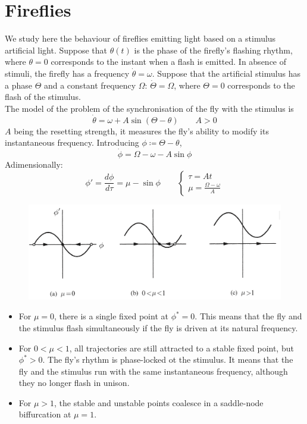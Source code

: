 \documentclass[12pt, openany]{report}
\theoremstyle{definition}
\begin{document}
\section{Fireflies}
We study here the behaviour of fireflies emitting light based on a stimulus artificial light. Suppose that $\theta(t)$ is the phase of the firefly's flashing rhythm, where $\theta = 0$ corresponds to the instant when a flash is emitted. In absence of stimuli, the firefly has a frequency $\dot \theta = \omega$. Suppose that the artificial stimulus has a phase $\Theta$ and a constant frequency $\Omega$: $\dot \Theta = \Omega$, where $\Theta=0$ corresponds to the flash of the stimulus. \\
The model of the problem of the synchronisation of the fly with the stimulus is 
\begin{equation}
    \dot \theta = \omega + A\sin (\Theta-\theta)\qquad A>0
\end{equation}
$A$ being the resetting strength, it measures the fly's ability to modify its instantaneous frequency. Introducing $\phi \coloneqq \Theta-\theta$, 
\begin{equation}
    \dot \phi = \Omega-\omega -A\sin \phi
\end{equation}
Adimensionally: 
\begin{equation}
    \phi'=\frac{d\phi}{d\tau}=\mu-\sin \phi \qquad \begin{cases}
        \tau = At\\
        \mu = \frac{\Omega-\omega}{A}
    \end{cases}
\end{equation}
\begin{figure}[H]
    \centering
    \includegraphics[width=.5\textwidth]{img/fly.png}
\end{figure}
\begin{itemize}
    \item For $\mu=0$, there is a single fixed point at $\phi^*=0$. This means that the fly and the stimulus flash simultaneously if the fly is driven at its natural frequency.
    \item For $0<\mu<1$, all trajectories are still attracted to a stable fixed point, but $\phi^*>0$. The fly's rhythm is phase-locked ot the stimulus. It means that the fly and the stimulus run with the same instantaneous frequency, although they no longer flash in unison. 
    \item For $\mu>1$, the stable and unstable points coalesce in a saddle-node biffurcation at $\mu=1$. 
\end{itemize}
\end{document}
